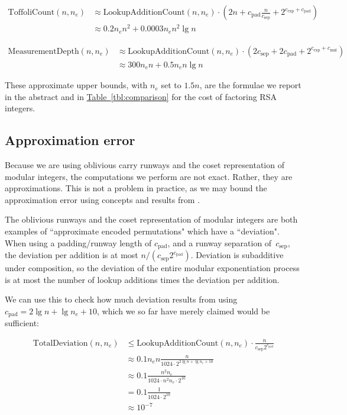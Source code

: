 \documentclass[superscriptaddress,notitlepage,longbibliography]{revtex4-1}
\theoremstyle{definition}
\theoremstyle{definition}
\newcommand{\tbl}[1]{\hyperref[tbl:#1]{Table~\ref*{tbl:#1}}}
\newcommand{\lenexp}{{n_e}}
\newcommand{\gexp}{{c_{\text{exp}}}}
\newcommand{\gmul}{{c_{\text{mul}}}}
\newcommand{\gsep}{{c_{\text{sep}}}}
\newcommand{\gpad}{{c_{\text{pad}}}}
\begin{document}
\begin{equation}
\begin{aligned}
    \text{ToffoliCount}(n, \lenexp)
    &\approx \text{LookupAdditionCount}(n, \lenexp) \cdot \left(2n + \gpad \frac{n}{\gsep} + 2^{\gexp + \gpad} \right)
    \\&\approx 0.2 \lenexp n^2 + 0.0003 \lenexp n^2 \lg n
\end{aligned}
\end{equation}

\begin{equation}
\begin{aligned}
    \text{MeasurementDepth}(n, \lenexp)
    &\approx \text{LookupAdditionCount}(n, \lenexp) \cdot \left(2 \gsep + 2\gpad + 2^{\gexp + \gmul} \right)
    \\&\approx 300 \lenexp n + 0.5 \lenexp n \lg n
\end{aligned}
\end{equation}

These approximate upper bounds, with $\lenexp$ set to $1.5n$, are the formulae we report in the abstract and in \tbl{comparison} for the cost of factoring RSA integers.


\subsection{Approximation error}

Because we are using oblivious carry runways and the coset representation of modular integers, the computations we perform are not exact.
Rather, they are approximations.
This is not a problem in practice, as we may bound the approximation error using concepts and results from \cite{gidney2019approximatepermutation}.

The oblivious runways and the coset representation of modular integers are both examples of ``approximate encoded permutations" which have a ``deviation".
When using a padding/runway length of $\gpad$, and a runway separation of~$\gsep$, the deviation per addition is at most $n / (\gsep 2^{\gpad})$.
Deviation is subadditive under composition, so the deviation of the entire modular exponentiation process is at most the number of lookup additions times the deviation per addition.

We can use this to check how much deviation results from using $\gpad = 2 \lg n + \lg \lenexp + 10$, which we so far have merely claimed would be sufficient:

\begin{equation}
\begin{aligned}
    \text{TotalDeviation}(n, \lenexp)
    &\leq \text{LookupAdditionCount}(n, \lenexp) \cdot \frac{n}{\gsep 2^{\gpad}}
    \\&\approx 0.1 \lenexp n \frac{n}{1024 \cdot 2^{2 \lg n + \lg \lenexp + 10}}
    \\&\approx 0.1 \frac{n^2 \lenexp}{1024 \cdot n^2 \lenexp \cdot 2^{10}}
    \\&= 0.1 \frac{1}{1024 \cdot 2^{10}}
    \\&\approx 10^{-7}
\end{aligned}
\end{equation}
\end{document}
